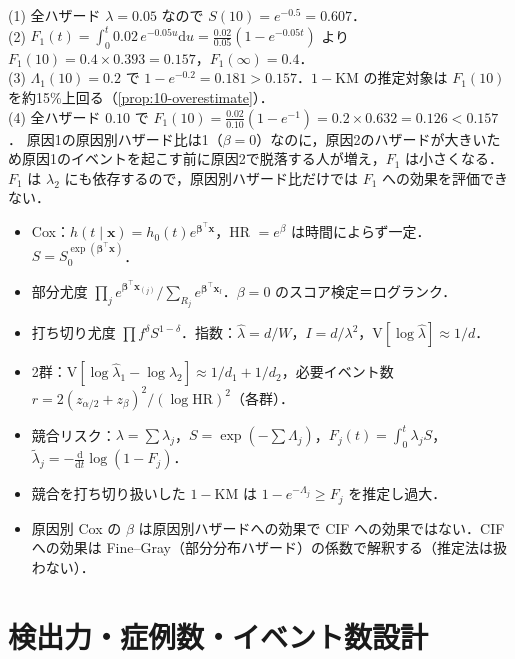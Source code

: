 \documentclass[a4paper,11pt,openany]{ltjsbook}
\newenvironment{kaitou}[1]{%
  \par\medskip\noindent
  \begin{tcolorbox}[enhanced,breakable,colback=bkgray!3,colframe=bkgray!60,boxrule=0.4pt,
    left=4pt,right=4pt,top=2pt,bottom=2pt,arc=1pt,
    title={\cref{#1}の解答},fonttitle=\bfseries\small,coltitle=white,colbacktitle=bkgray!80]}%
  {\end{tcolorbox}\par}
\newcommand{\V}{\mathrm{V}}
\newcommand{\dd}{\mathrm{d}}
\newcommand{\HR}{\mathrm{HR}}
\newcommand{\transp}{^{\top}}
\begin{document}
\begin{kaitou}{reidai:10-4}
(1) 全ハザード $\lambda=0.05$ なので $S(10)=e^{-0.5}=0.607$．\\
(2) $F_1(t)=\int_0^t0.02\,e^{-0.05u}\dd u=\frac{0.02}{0.05}(1-e^{-0.05t})$ より $F_1(10)=0.4\times0.393=0.157$，$F_1(\infty)=0.4$．\\
(3) $\Lambda_1(10)=0.2$ で $1-e^{-0.2}=0.181>0.157$．$1-\mathrm{KM}$ の推定対象は $F_1(10)$ を約15\%上回る（\cref{prop:10-overestimate}）．\\
(4) 全ハザード $0.10$ で $F_1(10)=\frac{0.02}{0.10}(1-e^{-1})=0.2\times0.632=0.126<0.157$．
原因1の原因別ハザード比は1（$\beta=0$）なのに，原因2のハザードが大きいため原因1のイベントを起こす前に原因2で脱落する人が増え，$F_1$ は小さくなる．
$F_1$ は $\lambda_2$ にも依存するので，原因別ハザード比だけでは $F_1$ への効果を評価できない．
\end{kaitou}

\begin{summarybox}
\begin{itemize}
\item Cox：$h(t\mid\bm x)=h_0(t)e^{\bm\beta\transp\bm x}$，HR $=e^\beta$ は時間によらず一定．$S=S_0^{\exp(\bm\beta\transp\bm x)}$．
\item 部分尤度 $\prod_j e^{\bm\beta\transp\bm x_{(j)}}/\sum_{R_j}e^{\bm\beta\transp\bm x_l}$．$\beta=0$ のスコア検定＝ログランク．
\item 打ち切り尤度 $\prod f^{\delta}S^{1-\delta}$．指数：$\hat\lambda=d/W$，$I=d/\lambda^2$，$\V[\log\hat\lambda]\approx1/d$．
\item 2群：$\V[\log\hat\lambda_1-\log\hat\lambda_2]\approx1/d_1+1/d_2$，必要イベント数 $r=2(z_{\alpha/2}+z_\beta)^2/(\log\HR)^2$（各群）．
\item 競合リスク：$\lambda=\sum\lambda_j$，$S=\exp(-\sum\Lambda_j)$，$F_j(t)=\int_0^t\lambda_jS$，$\tilde\lambda_j=-\frac{\dd}{\dd t}\log(1-F_j)$．
\item 競合を打ち切り扱いした $1-\mathrm{KM}$ は $1-e^{-\Lambda_j}\ge F_j$ を推定し過大．
\item 原因別 Cox の $\beta$ は原因別ハザードへの効果で CIF への効果ではない．CIF への効果は Fine--Gray（部分分布ハザード）の係数で解釈する（推定法は扱わない）．
\end{itemize}
\end{summarybox}

\chapter{検出力・症例数・イベント数設計}\label{ch:12}
\end{document}
